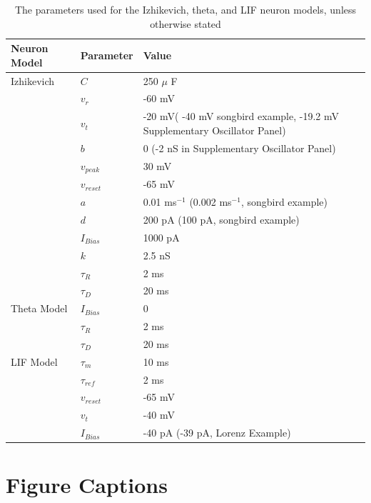 \documentclass[11pt]{article} %
\begin{document}
\begin{table}[htp!]
\center
\begin{tabular}{|l|l|l|}
\hline 
Neuron Model & Parameter & Value \\
\hline
Izhikevich & $C$ & 250 $\mu$ F  \\ 
\hline
& $v_r$ & -60 mV \\ 
\hline
& $v_{t}$ & -20 mV( -40 mV songbird example, -19.2 mV Supplementary Oscillator Panel) \\ 
\hline
& $b$ & 0  (-2 nS in Supplementary Oscillator Panel)\\ 
\hline
& $v_{peak}$ & 30 mV \\ 
\hline
& $v_{reset}$ & -65 mV \\ 
\hline
& $a$ & 0.01 ms$^{-1}$ (0.002 ms$^{-1}$, songbird example) \\ 
\hline
& $d$ & 200 pA (100 pA, songbird example) \\ 
\hline
& $I_{Bias}$ & 1000 pA \\
\hline
& $k$ & 2.5 nS  \\
\hline
& $\tau_R$ & 2 ms\\
\hline
&  $\tau_D$ & 20 ms \\
\hline 
Theta Model & $I_{Bias}$ & 0 \\
\hline
 & $\tau_R$  & 2 ms \\
\hline 
& $\tau_D $  & 20 ms\\
\hline 
LIF Model &$\tau_m$ & 10 ms  \\
\hline 
& $\tau_{ref}$ & 2 ms  \\ 
\hline 
&$v_{reset}$ & -65 mV  \\
\hline 
& $v_{t}$ & -40 mV \\ 
\hline 
& $I_{Bias}$& -40 pA (-39 pA, Lorenz Example) \\
\hline 
\end{tabular}
\caption{The parameters used for the Izhikevich, theta, and LIF neuron models, unless otherwise stated} \label{Table1} 
\end{table}



\newpage 
\section*{Figure Captions} 
\end{document}
